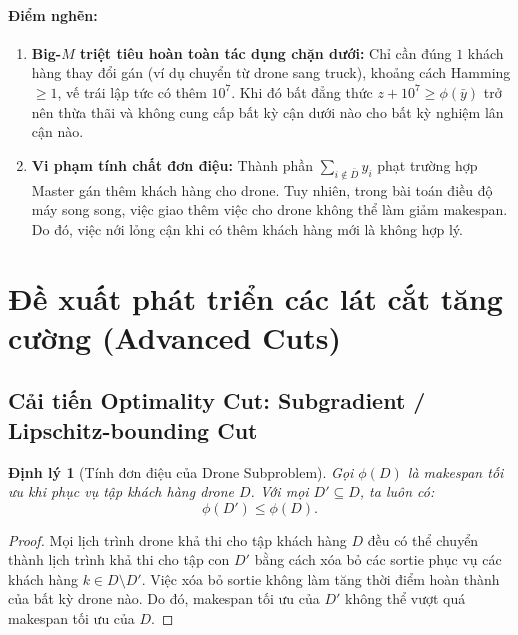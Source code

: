 \documentclass[12pt,a4paper]{article}
\newtheorem{theorem}{Định lý}
\begin{document}
\paragraph{Điểm nghẽn:}
\begin{enumerate}[leftmargin=2em]
    \item \textbf{Big-$M$ triệt tiêu hoàn toàn tác dụng chặn dưới:} Chỉ cần đúng $1$ khách hàng thay đổi gán (ví dụ chuyển từ drone sang truck), khoảng cách Hamming $\ge 1$, vế trái lập tức có thêm $10^7$. Khi đó bất đẳng thức $z + 10^7 \ge \phi(\bar{y})$ trở nên thừa thãi và không cung cấp bất kỳ cận dưới nào cho bất kỳ nghiệm lân cận nào.
    \item \textbf{Vi phạm tính chất đơn điệu:} Thành phần $\sum_{i \notin \bar{D}} y_i$ phạt trường hợp Master gán thêm khách hàng cho drone. Tuy nhiên, trong bài toán điều độ máy song song, việc giao thêm việc cho drone không thể làm giảm makespan. Do đó, việc nới lỏng cận khi có thêm khách hàng mới là không hợp lý.
\end{enumerate}

\section{Đề xuất phát triển các lát cắt tăng cường (Advanced Cuts)}
\label{sec:advanced-cuts}

\subsection{Cải tiến Optimality Cut: Subgradient / Lipschitz-bounding Cut}

\begin{theorem}[Tính đơn điệu của Drone Subproblem]
Gọi $\phi(D)$ là makespan tối ưu khi phục vụ tập khách hàng drone $D$. Với mọi $D' \subseteq D$, ta luôn có:
\begin{equation}
    \phi(D') \le \phi(D).
\end{equation}
\end{theorem}
\begin{proof}
Mọi lịch trình drone khả thi cho tập khách hàng $D$ đều có thể chuyển thành lịch trình khả thi cho tập con $D'$ bằng cách xóa bỏ các sortie phục vụ các khách hàng $k \in D \setminus D'$. Việc xóa bỏ sortie không làm tăng thời điểm hoàn thành của bất kỳ drone nào. Do đó, makespan tối ưu của $D'$ không thể vượt quá makespan tối ưu của $D$.
\end{proof}
\end{document}
